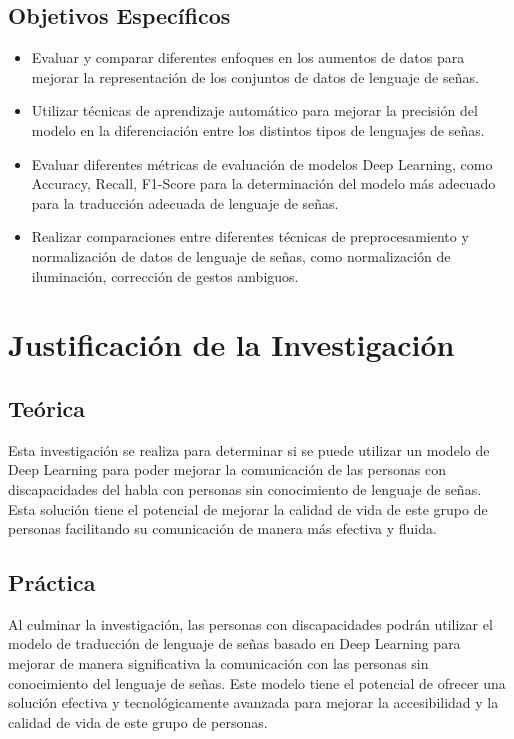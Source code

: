 \subsection{Objetivos Espec\'{i}ficos}
\newcommand{\Objone}{
Evaluar y comparar diferentes enfoques en los aumentos de datos para mejorar la representación de los conjuntos de datos de lenguaje de señas.
}
\newcommand{\Objtwo}{
Utilizar técnicas de aprendizaje automático para mejorar la precisión del modelo en la diferenciación entre los distintos tipos de lenguajes de señas. 
}
\newcommand{\Objthree}{
Evaluar diferentes métricas de evaluación de modelos Deep Learning, como Accuracy, Recall, F1-Score para la determinación del modelo más adecuado para la traducción adecuada de lenguaje de señas.
}
\newcommand{\Objtfour}{
	Realizar comparaciones entre diferentes técnicas de preprocesamiento y normalización de datos de lenguaje de señas, como normalización de iluminación, corrección de gestos ambiguos.
}

\begin{itemize}
	\item {\Objone}
	\item {\Objtwo}
	\item {\Objthree}
	\item {\Objtfour}
\end{itemize}

\section{Justificación de la Investigación}

\subsection{Teórica}
Esta investigación se realiza para determinar si se puede utilizar un modelo de Deep Learning para poder mejorar la comunicación de las personas con discapacidades del habla con personas sin conocimiento de lenguaje de señas. Esta solución tiene el potencial de mejorar la calidad de vida de este grupo de personas facilitando su comunicación de manera más efectiva y fluida.

\subsection{Práctica}
Al culminar la investigación, las personas con discapacidades podrán utilizar el modelo de traducción de lenguaje de señas basado en Deep Learning para mejorar de manera significativa la comunicación con las personas sin conocimiento del lenguaje de señas. Este modelo tiene el potencial de ofrecer una solución efectiva y tecnológicamente avanzada para mejorar la accesibilidad y la calidad de vida de este grupo de personas.

